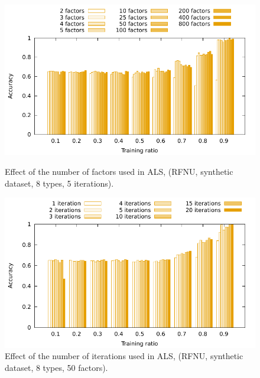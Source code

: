 \documentclass[10pt, conference, compsocconf]{IEEEtran}
\begin{document}
\newpage

\onecolumn

\begin{figure}
\begin{minipage}{0.45\textwidth}
\includegraphics[width=\columnwidth]{data/results/means_of_results/ALS/Synthetic/8type-RFNU-Differ-Num-Factors/ALS-8-types-ranks.pdf}
\caption{Effect of the number of factors used in ALS, (RFNU, synthetic dataset, 8 types, 5 iterations).}
\label{fig:factors}
\end{minipage}\hfill
\begin{minipage}{0.45\textwidth}
\includegraphics[width=\columnwidth]{data/results/means_of_results/ALS/Synthetic/8type-RFNU-Differ-Num-Iterations-rank50/ALS-8-types-iteration.pdf}
\caption{Effect of the number of iterations used in ALS, (RFNU, synthetic dataset, 8 types, 50 factors).}
\label{fig:iterations}
\end{minipage}
\end{figure}
\end{document}
